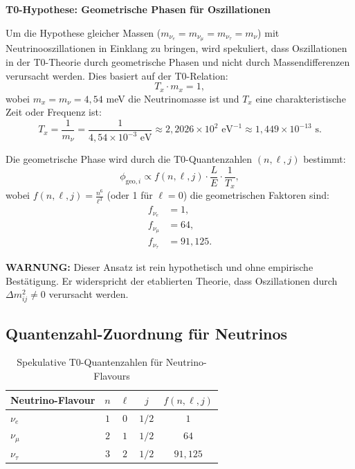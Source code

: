 	\begin{speculation}
		\textbf{T0-Hypothese: Geometrische Phasen für Oszillationen}
		
		Um die Hypothese gleicher Massen ($m_{\nu_e} = m_{\nu_\mu} = m_{\nu_\tau} = m_\nu$) mit Neutrinooszillationen in Einklang zu bringen, wird spekuliert, dass Oszillationen in der T0-Theorie durch geometrische Phasen und nicht durch Massendifferenzen verursacht werden. Dies basiert auf der T0-Relation:
		\[
		T_x \cdot m_x = 1,
		\]
		wobei $m_x = m_\nu = 4,54$ meV die Neutrinomasse ist und $T_x$ eine charakteristische Zeit oder Frequenz ist:
		\[
		T_x = \frac{1}{m_\nu} = \frac{1}{4,54 \times 10^{-3} \text{ eV}} \approx 2,2026 \times 10^2 \text{ eV}^{-1} \approx 1,449 \times 10^{-13} \text{ s}.
		\]
		
		Die geometrische Phase wird durch die T0-Quantenzahlen $(n, \ell, j)$ bestimmt:
		\[
		\phi_{\text{geo}, i} \propto f(n, \ell, j) \cdot \frac{L}{E} \cdot \frac{1}{T_x},
		\]
		wobei $f(n, \ell, j) = \frac{n^6}{\ell^3}$ (oder 1 für $\ell = 0$) die geometrischen Faktoren sind:
		\begin{align}
			f_{\nu_e} &= 1, \\
			f_{\nu_\mu} &= 64, \\
			f_{\nu_\tau} &= 91,125.
		\end{align}
		
		\textbf{WARNUNG:} Dieser Ansatz ist rein hypothetisch und ohne empirische Bestätigung. Er widerspricht der etablierten Theorie, dass Oszillationen durch $\Delta m^2_{ij} \neq 0$ verursacht werden.
	\end{speculation}
	
	\subsection{Quantenzahl-Zuordnung für Neutrinos}
	
	\begin{table}[h]
		\centering
		\begin{tabular}{lcccc}
			\toprule
			\textbf{Neutrino-Flavour} & \textbf{$n$} & \textbf{$\ell$} & \textbf{$j$} & \textbf{$f(n,\ell,j)$} \\
			\midrule
			$\nu_e$ & $1$ & $0$ & $1/2$ & $1$ \\
			$\nu_\mu$ & $2$ & $1$ & $1/2$ & $64$ \\
			$\nu_\tau$ & $3$ & $2$ & $1/2$ & $91,125$ \\
			\bottomrule
		\end{tabular}
		\caption{Spekulative T0-Quantenzahlen für Neutrino-Flavours}
	\end{table}
	
